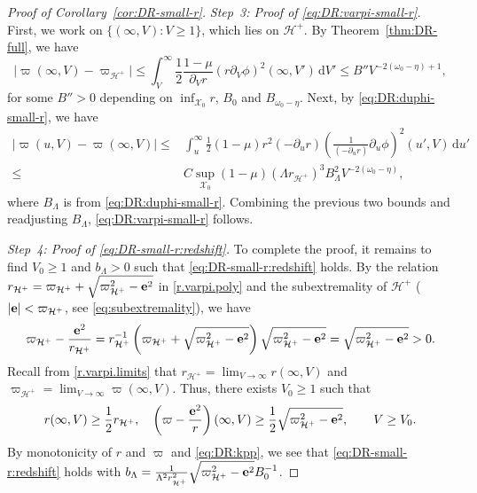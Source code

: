 \documentclass[10pt, reqno]{amsart}
\theoremstyle{definition}
\theoremstyle{remark}
\theoremstyle{conjecture}
\numberwithin{equation}{section}
\newcommand{\abs}[1]{\vert#1\vert}
\newcommand{\set}[1]{\{#1\}}
\newcommand{\ud}{\mathrm{d}}
\newcommand{\rd}{\partial}
\newcommand{\0}{\emptyset}
\newcommand{\Lmb}{\Lambda}
\newcommand{\omg}{\omega}
\newcommand{\bfe}{{\bf e}}
\newcommand{\calH}{\mathcal H}
\newcommand{\calX}{\mathcal X}
\newcommand{\EH}{\calH^{+}}
\newcommand{\pfstep}[1]{\vspace{.5em} {\it \noindent #1.}}
\newcommand{\e}{\bfe}							%
\begin{document}
\begin{proof}[Proof of Corollary~\ref{cor:DR-small-r}]
\pfstep{Step~3: Proof of \eqref{eq:DR:varpi-small-r}}
First, we work on $\set{(\infty, V) : V \geq 1}$, which lies on $\EH$. By Theorem~\ref{thm:DR-full}, we have
\begin{equation*}
	\abs{\varpi(\infty, V) - \varpi_{\EH}}
	\leq \int_{V}^{\infty} \frac{1}{2} \frac{1-\mu}{\rd_{V} r} \left(r \rd_{V} \phi \right)^{2} (\infty, V') \, \ud V'
	\leq B'' V^{-2 (\omg_{0} - \eta) + 1},
\end{equation*}
for some $B'' > 0$ depending on $\inf_{\calX_{0}} r$, $B_{0}$ and $B_{\omg_{0} - \eta}$. Next, by \eqref{eq:DR:duphi-small-r}, we have
\begin{align*}
	\abs{\varpi(u, V) - \varpi(\infty, V)}
	\leq & \int_{u}^{\infty} \frac{1}{2} (1-\mu) r^{2} (- \rd_{u} r) \left(\frac{1}{(-\rd_{u} r)} \rd_{u} \phi\right)^{2} (u', V) \, \ud u' \\
	\leq & C \sup_{\calX_{0}} (1-\mu) (\Lmb r_{\EH})^{3} B_{\Lmb}^{2} V^{-2 (\omg_{0} - \eta)},
\end{align*}
where $B_{\Lmb}$ is from \eqref{eq:DR:duphi-small-r}. Combining the previous two bounds and readjusting $B_{\Lmb}$, \eqref{eq:DR:varpi-small-r} follows.

\pfstep{Step~4: Proof of \eqref{eq:DR-small-r:redshift}}
To complete the proof, it remains to find $V_{0} \geq 1$ and $b_{\Lmb} > 0$ such that \eqref{eq:DR-small-r:redshift} holds. By the relation $r_{\EH} = \varpi_{\EH} + \sqrt{\varpi_{\EH}^{2} - \e^{2}}$ in \eqref{r.varpi.poly} and the subextremality of $\EH$ ($\abs{\e} < \varpi_{\EH}$, see \eqref{eq:subextremality}), we have
\begin{equation*}
	\varpi_{\EH}  - \frac{\e^{2}}{r_{\EH}}
	= r_{\EH}^{-1}\left( \varpi_{\EH} + \sqrt{\varpi_{\EH}^{2} - \e^{2}} \right) \sqrt{\varpi_{\EH}^{2} - \e^{2}}
	= \sqrt{\varpi_{\EH}^{2} - \e^{2}} > 0.
\end{equation*}
Recall from \eqref{r.varpi.limits} that $r_{\EH} = \lim_{V \to \infty} r(\infty, V)$ and $\varpi_{\EH} = \lim_{V \to \infty} \varpi(\infty, V)$. Thus, there exists $V_{0} \geq 1$ such that
\begin{equation*}
	r(\infty, V) \geq \frac{1}{2} r_{\EH}, \quad
	\left( \varpi - \frac{\e^{2}}{r}\right)(\infty, V) \geq \frac{1}{2} \sqrt{\varpi_{\EH}^{2} - \e^{2}}, \qquad
	V \geq V_{0}.
\end{equation*}
By monotonicity of $r$ and $\varpi$ and \eqref{eq:DR:kpp}, we see that \eqref{eq:DR-small-r:redshift} holds with $b_{\Lmb} = \frac{1}{\Lmb^{2} r_{\EH}^{2}} \sqrt{\varpi_{\EH}^{2} - \e^{2}} B_{0}^{-1}$. \qedhere
\end{proof}
\end{document}
